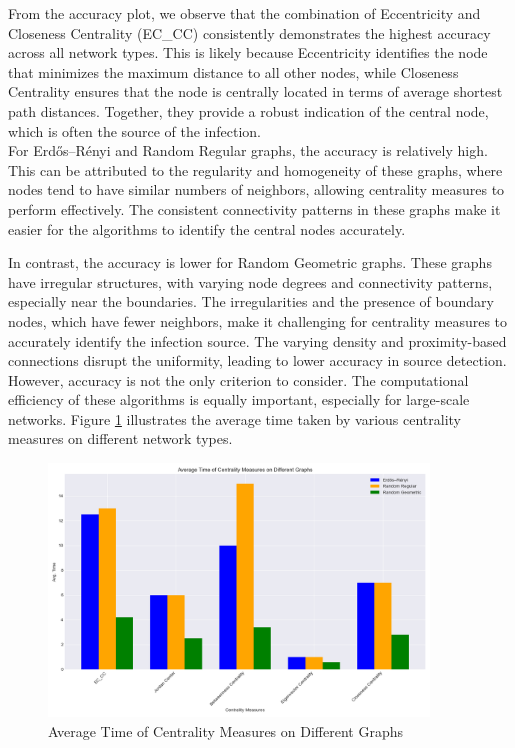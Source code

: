 From the accuracy plot, we observe that the combination of Eccentricity and Closeness Centrality (EC\_CC) consistently demonstrates the highest accuracy across all network types. This is likely because Eccentricity identifies the node that minimizes the maximum distance to all other nodes, while Closeness Centrality ensures that the node is centrally located in terms of average shortest path distances. Together, they provide a robust indication of the central node, which is often the source of the infection.\\

For Erdős–Rényi and Random Regular graphs, the accuracy is relatively high. This can be attributed to the regularity and homogeneity of these graphs, where nodes tend to have similar numbers of neighbors, allowing centrality measures to perform effectively. The consistent connectivity patterns in these graphs make it easier for the algorithms to identify the central nodes accurately.

In contrast, the accuracy is lower for Random Geometric graphs. These graphs have irregular structures, with varying node degrees and connectivity patterns, especially near the boundaries. The irregularities and the presence of boundary nodes, which have fewer neighbors, make it challenging for centrality measures to accurately identify the infection source. The varying density and proximity-based connections disrupt the uniformity, leading to lower accuracy in source detection.\\

However, accuracy is not the only criterion to consider. The computational efficiency of these algorithms is equally important, especially for large-scale networks. Figure \ref{fig:average_time_centrality_measures} illustrates the average time taken by various centrality measures on different network types.

\begin{figure}[H]
    \centering
    \includegraphics[width=0.9\textwidth]{Average_Time_Centrality_Measures.png}
    \caption{Average Time of Centrality Measures on Different Graphs}
    \label{fig:average_time_centrality_measures}
\end{figure}

